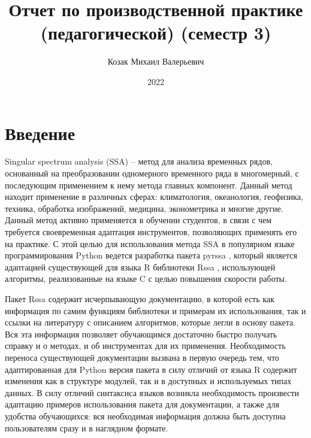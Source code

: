 \documentclass[specialist,
			   substylefile = spbu_report.rtx,
			   subf,href,colorlinks=true, 12pt]{disser}
\begin{document}
%
%

\title{Отчет по производственной практике (педагогической) (семестр 3)}


\author{Козак Михаил Валерьевич}


\date{2022}

\maketitle

\tableofcontents

\chapter{Введение}

Singular spectrum analysis (SSA) \cite{ssa-method} – метод для анализа временных рядов, основанный на преобразовании одномерного временного ряда в многомерный, с последующим применением к нему метода главных компонент. Данный метод находит применение в различных сферах: климатология, океанология, геофизика, техника, обработка изображений, медицина, эконометрика и многие другие. \\

Данный метод активно применяется в обучении студентов, в связи с чем требуется своевременная адаптация инструментов, позволяющих применять его на практике. С этой целью для использования метода SSA в популярном языке программирования Python ведется разработка пакета pyrssa \cite{pyrssa-lib}, который является адаптацией существующей для языка R библиотеки Rssa \cite{rssa-book, rssa-doc}, использующей алгоритмы, реализованные на языке C с целью повышения скорости работы. 

Пакет Rssa  содержит исчерпывающую документацию, в которой есть как информация по самим функциям библиотеки и примерам их использования, так и ссылки на литературу с описанием алгоритмов, которые легли в основу пакета. Вся эта информация позволяет обучающимся достаточно быстро получать справку и о методах, и об инструментах для их применения. Необходимость переноса существующей документации вызвана в первую очередь тем, что адаптированная для Python версия пакета в силу отличий от языка R содержит изменения как в структуре модулей, так и в доступных и используемых типах данных. В силу отличий синтаксиса языков возникла необходимость произвести адаптацию примеров использования пакета  для документации, а также для удобства обучающихся: вся необходимая информация должна быть доступна пользователям сразу и в наглядном формате.
\end{document}
